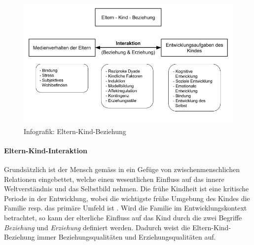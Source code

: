 \begin{figure}%
  \centering
     \includegraphics[width=1.0\textwidth]{content/Grafik/Infografik_ElternKindBeziehung_Uebersicht.png}
  \caption{Infografik: Eltern-Kind-Beziehung}
  \label{fig:InfografikElternKindBeziehung}
\end{figure}

\paragraph{Eltern-Kind-Interaktion}\label{sec:Interaktion}
Grundsätzlich ist der Mensch gemäss  in ein Gefüge von zwischenmenschlichen Relationen eingebettet, welche einen wesentlichen Einfluss auf das innere Weltverständnis und das Selbstbild nehmen.  Die frühe Kindheit ist eine kritische Periode in der Entwicklung, wobei die wichtigste frühe Umgebung des Kindes die Familie resp. das primäre Umfeld ist \cite{Resch1999}. Wird die Familie im Entwicklungskontext betrachtet, so kann der elterliche Einfluss auf das Kind durch die zwei Begriffe \textit{Beziehung} und \textit{Erziehung} definiert werden. Dadurch weist die Eltern-Kind-Beziehung immer Beziehungsqualitäten und Erziehungsqualitäten auf.  

